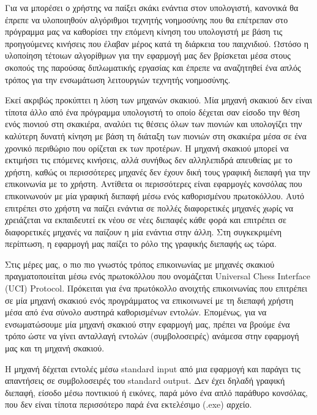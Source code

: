 Για να μπορέσει ο χρήστης να παίξει σκάκι ενάντια στον υπολογιστή, κανονικά θα έπρεπε να υλοποιηθούν αλγόριθμοι τεχνητής νοημοσύνης που θα επέτρεπαν στο πρόγραμμα μας να καθορίσει την επόμενη κίνηση του υπολογιστή με βάση τις προηγούμενες κινήσεις που έλαβαν μέρος κατά τη διάρκεια του παιχνιδιού. Ωστόσο η υλοποίηση τέτοιων αλγορίθμων για την εφαρμογή μας δεν βρίσκεται μέσα στους σκοπούς της παρούσας διπλωματικής εργασίας και έπρεπε να αναζητηθεί ένα απλός τρόπος για την ενσωμάτωση λειτουργιών τεχνητής νοημοσύνης. 


Εκεί ακριβώς προκύπτει η λύση των μηχανών σκακιού. Μία μηχανή σκακιού δεν είναι τίποτα άλλο από ένα πρόγραμμα υπολογιστή το οποίο δέχεται σαν είσοδο την θέση ενός πιονιού στη σκακιέρα, αναλύει τις θέσεις όλων των πιονιών και υπολογίζει την καλύτερη δυνατή κίνηση με βάση τη διάταξη των πιονιών στη σκακιέρα μέσα σε ένα χρονικό περιθώριο που ορίζεται εκ των προτέρων. Η μηχανή σκακιού μπορεί να εκτιμήσει τις επόμενες κινήσεις, αλλά συνήθως δεν αλληλεπιδρά απευθείας με το χρήστη, καθώς οι περισσότερες μηχανές δεν έχουν δική τους γραφική διεπαφή για την επικοινωνία με το χρήστη. Αντίθετα οι περισσότερες είναι εφαρμογές κονσόλας που επικοινωνούν με μία γραφική διεπαφή μέσω ενός καθορισμένου πρωτοκόλλου. Αυτό επιτρέπει στο χρήστη να παίζει ενάντια σε πολλές διαφορετικές μηχανές χωρίς να χρειάζεται να εκπαιδευτεί εκ νέου σε νέες διεπαφές κάθε φορά και επιτρέπει σε διαφορετικές μηχανές να παίζουν η μία ενάντια στην άλλη. Στη συγκεκριμένη περίπτωση, η εφαρμογή μας παίζει το ρόλο της γραφικής διεπαφής ως τώρα. 


Στις μέρες μας, ο πιο πιο γνωστός τρόπος επικοινωνίας με μηχανές σκακιού πραγματοποιείται μέσω ενός πρωτοκόλλου που ονομάζεται Universal Chess Interface (UCI) Protocol. Πρόκειται για ένα πρωτόκολλο ανοιχτής επικοινωνίας που επιτρέπει σε μία μηχανή σκακιού ενός προγράμματος να επικοινωνεί με τη διεπαφή χρήστη μέσα από ένα σύνολο αυστηρά καθορισμένων εντολών. Επομένως, για να ενσωματώσουμε μία μηχανή σκακιού στην εφαρμογή μας, πρέπει να βρούμε ένα τρόπο ώστε να γίνει ανταλλαγή εντολών (συμβολοσειρές) ανάμεσα στην εφαρμογή μας και τη μηχανή σκακιού. 


Η μηχανή δέχεται εντολές μέσω standard input από μια εφαρμογή και παράγει τις απαντήσεις σε συμβολοσειρές του standard output. Δεν έχει δηλαδή γραφική διεπαφή, είσοδο μέσω ποντικιού ή εικόνες, παρά μόνο ένα απλό παράθυρο κονσόλας, που δεν είναι τίποτα περισσότερο παρά ένα εκτελέσιμο (.exe) αρχείο. 

